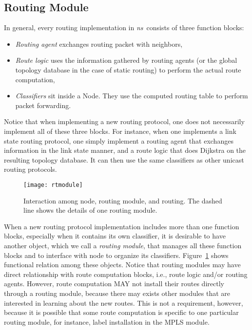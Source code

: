 \subsection{Routing Module}

In general, every routing implementation in \emph{ns}\ consists of three
function blocks: 
\begin{itemize}
\item {\em Routing agent} exchanges routing packet with neighbors, 
\item {\em Route logic} uses the information gathered by routing
  agents (or the global topology database in the case of static
  routing) to perform the actual route computation, 
\item {\em Classifiers} sit inside a Node. They use the computed
  routing table to perform packet forwarding.
\end{itemize}
Notice that when implementing a new routing protocol, one does not
necessarily implement all of these three blocks.
For instance, when one implements a link state routing protocol, one
simply implement a routing agent that exchanges information in the
link state manner, and a route logic that does Dijkstra on the
resulting topology database. 
It can then use the same classifiers as other unicast routing
protocols.

\begin{figure}[tb]
  \begin{center}
    \texttt{[image: rtmodule]}
    \caption{Interaction among node, routing module, and routing. The
      dashed line shows the details of one routing module.}
    \label{fig:node:rtmodule}
  \end{center}
\end{figure}

When a new routing protocol implementation includes more than one
function blocks, especially when it contains its own classifier, it is
desirable to have another object, which we call 
a {\em routing module}, that manages all these function 
blocks and to interface with node to organize its classifiers.
Figure~\ref{fig:node:rtmodule} shows functional relation among these
objects.
Notice that routing modules may have direct relationship with route
computation blocks, i.e., route logic and/or routing agents.
However, route computation MAY not install their routes directly
through a routing module, because there may exists other modules that
are interested in learning about the new routes.
This is not a requirement, however, because it is possible that some
route computation is specific to one particular routing module, for
instance, label installation in the MPLS module. 

